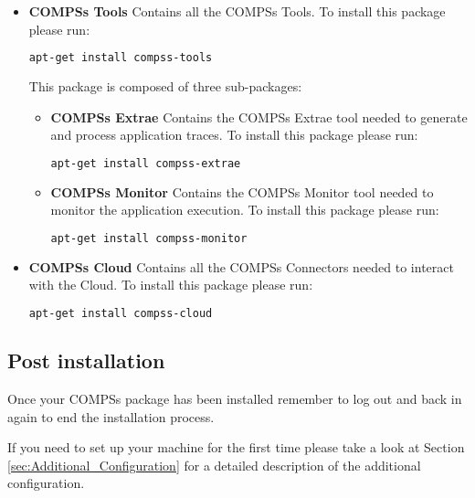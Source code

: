 \begin{itemize}
 \item \textbf{COMPSs Tools} \newline
       Contains all the COMPSs Tools.
       \newline
       To install this package please run:
       \begin{lstlisting}[language=bash]
	  apt-get install compss-tools
       \end{lstlisting}
       This package is composed of three sub-packages:
       \begin{itemize}
        \item \textbf{COMPSs Extrae} \newline
	      Contains the COMPSs Extrae tool needed to generate and process application traces.
	      \newline
	      To install this package please run:
	      \begin{lstlisting}[language=bash]
		  apt-get install compss-extrae
	      \end{lstlisting}
        \item \textbf{COMPSs Monitor} \newline
              Contains the COMPSs Monitor tool needed to monitor the application execution. 
              \newline
	      To install this package please run:
	      \begin{lstlisting}[language=bash]
		  apt-get install compss-monitor
	      \end{lstlisting}
       \end{itemize}

 \item \textbf{COMPSs Cloud} \newline
       Contains all the COMPSs Connectors needed to interact with the Cloud.
       \newline
       To install this package please run:
       \begin{lstlisting}[language=bash]
	  apt-get install compss-cloud
       \end{lstlisting}
\end{itemize} 

\subsection{Post installation}
Once your COMPSs package has been installed remember to log out and back in again to end the installation process.

If you need to set up your machine for the first time please take a look at Section \ref{sec:Additional_Configuration} for a 
detailed description of the additional configuration. 